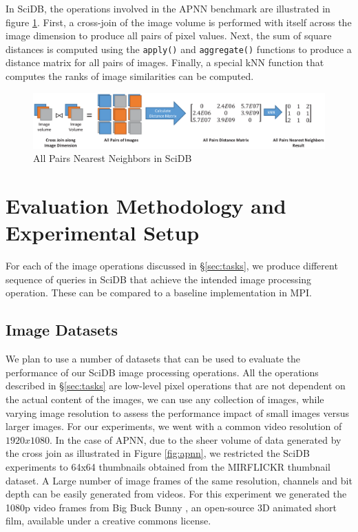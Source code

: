 \documentclass[letterpaper,twocolumn,10pt]{article}
\begin{document}
In SciDB, the operations involved in the APNN benchmark are illustrated in figure \ref{fig:apnn_scidb}. First, a cross-join of the image volume is performed with itself across the image dimension to produce all pairs of pixel values. Next, the sum of square distances is computed using the \texttt{apply()} and \texttt{aggregate()} functions to produce a distance matrix for all pairs of images. Finally, a special kNN function that computes the ranks of image similarities can be computed. 

\begin{figure}[ht]
\centering
\includegraphics[width=\textwidth]{figures/scidb_apnn.eps}
\caption{All Pairs Nearest Neighbors in SciDB}
\label{fig:apnn_scidb}
\end{figure}

\section{Evaluation Methodology and Experimental Setup}\label{sec:eval}
For each of the image operations discussed in \S\ref{sec:tasks}, we produce different sequence of queries in SciDB that achieve the intended image processing operation. These can be compared to a baseline implementation in MPI.

\subsection{Image Datasets}
We plan to use a number of datasets that can be used to evaluate the performance of our SciDB image processing operations. All the operations described in \S\ref{sec:tasks} are low-level pixel operations that are not dependent on the actual content of the images, we can use any collection of images, while varying image resolution to assess the performance impact of small images versus larger images. For our experiments, we went with a common video resolution of $1920x1080$. In the case of APNN, due to the sheer volume of data generated by the cross join as illustrated in Figure \ref{fig:apnn}, we restricted the SciDB experiments to 64x64 thumbnails obtained from the MIRFLICKR thumbnail dataset\cite{huiskes08}. A Large number of image frames of the same resolution, channels and bit depth can be easily generated from videos. For this experiment we generated the 1080p video frames from Big Buck Bunny \cite{BBB}, an open-source 3D animated short film, available under a creative commons license. 
\end{document}
